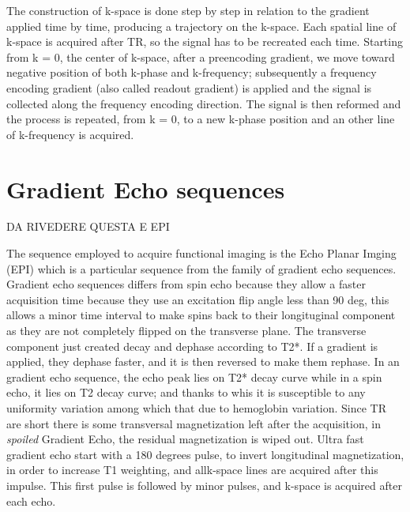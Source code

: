 \documentclass[12pt]{report}
\begin{document}
The construction of k-space is done step by step in relation to the gradient applied time by time, producing a trajectory on the k-space.
Each spatial line of k-space is acquired after TR, so the signal has to be recreated each time.
Starting from k = 0, the center of k-space, after a preencoding gradient, we move toward negative position of both k-phase and k-frequency; subsequently a frequency encoding gradient (also called readout gradient) is applied and the signal is collected along the frequency encoding direction.
The signal is then reformed and the process is repeated, from k = 0, to a new k-phase position and an other line of k-frequency is acquired.




\section{Gradient Echo sequences}
DA RIVEDERE QUESTA E EPI

The sequence employed to acquire functional imaging is the Echo Planar Imging (EPI) which is a particular sequence from the family of gradient echo sequences.
Gradient echo sequences differs from spin echo because they allow a faster acquisition time because they use an excitation flip angle less than 90 deg, this allows a minor time interval to make spins back to their longituginal component as they are not completely flipped on the transverse plane.
The transverse component just created decay and dephase according to T2*. If a gradient is applied, they dephase faster, and it is then reversed to make them rephase.
In an gradient echo sequence, the echo peak lies on T2* decay curve while in a spin echo, it lies on T2 decay curve; and thanks to whis it is susceptible to any uniformity variation among which that due to hemoglobin variation.
Since TR are short there is some transversal magnetization left after the acquisition, in \emph{spoiled} Gradient Echo, the residual magnetization is wiped out.
Ultra fast gradient echo start with a 180 degrees pulse, to invert longitudinal magnetization, in order to increase T1 weighting, and allk-space lines are acquired after this impulse. This first pulse is followed by minor pulses, and k-space is acquired after each echo.
\end{document}
